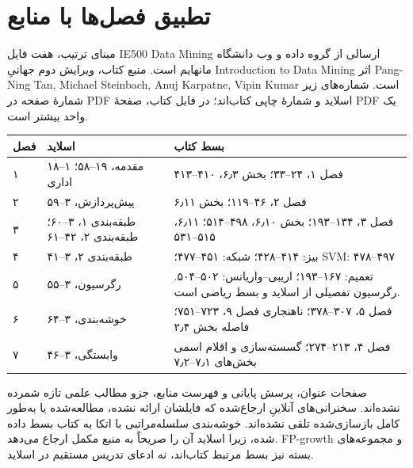 \section{تطبیق فصل‌ها با منابع}
مبنای ترتیب، هفت فایل IE500 Data Mining ارسالی از گروه داده و وب دانشگاه مانهایم است. منبع کتاب، ویرایش دوم جهانیِ Introduction to Data Mining اثر Pang-Ning Tan, Michael Steinbach, Anuj Karpatne, Vipin Kumar است. شماره‌های زیر شمارهٔ صفحه در PDF اسلاید و شمارهٔ چاپی کتاب‌اند؛ در فایل کتاب، صفحهٔ PDF یک واحد بیشتر است.
\begin{longtable}{lll}
\toprule
فصل & اسلاید & بسط کتاب\\\midrule\endhead
۱ & مقدمه، ۱۹–۵۸؛ ۱–۱۸ اداری & فصل ۱، ۲۴–۳۳؛ بخش ۶٫۳، ۴۱۰–۴۱۳\\
۲ & پیش‌پردازش، ۳–۵۹ & فصل ۲، ۴۶–۱۱۹؛ بخش ۶٫۱۱\\
۳ & طبقه‌بندی ۱، ۳–۶۰؛ طبقه‌بندی ۲، ۴۲–۶۱ & فصل ۳، ۱۳۴–۱۹۳؛ بخش ۶٫۱۰، ۴۹۸–۵۱۴؛ ۶٫۱۱، ۵۱۵–۵۳۱\\
۴ & طبقه‌بندی ۲، ۳–۴۱ & بیز: ۴۱۴–۴۲۸؛ شبکه: ۴۵۱–۴۷۷؛ SVM: ۴۷۸–۴۹۷\\
۵ & رگرسیون، ۳–۵۵ & تعمیم: ۱۶۷–۱۹۳؛ اریبی–واریانس: ۵۰۲–۵۰۴. رگرسیون تفصیلی از اسلاید و بسط ریاضی است.\\
۶ & خوشه‌بندی، ۳–۶۴ & فصل ۵، ۳۰۷–۳۷۸؛ ناهنجاری فصل ۹، ۷۲۳–۷۵۱؛ فاصله بخش ۲٫۴\\
۷ & وابستگی، ۳–۴۶ & فصل ۴، ۲۱۳–۲۷۴؛ گسسته‌سازی و اقلام اسمی بخش‌های ۷٫۱–۷٫۲\\
\bottomrule
\end{longtable}
صفحات عنوان، پرسش پایانی و فهرست منابع، جزو مطالب علمی تازه شمرده نشده‌اند. سخنرانی‌های آنلاینِ ارجاع‌شده که فایلشان ارائه نشده، مطالعه‌شده یا به‌طور کامل بازسازی‌شده تلقی نشده‌اند. خوشه‌بندی سلسله‌مراتبی با اتکا به کتاب بسط داده شده، زیرا اسلاید آن را صریحاً به منبع مکمل ارجاع می‌دهد. FP-growth و مجموعه‌های بسته نیز بسط مرتبط کتاب‌اند، نه ادعای تدریس مستقیم در اسلاید.

